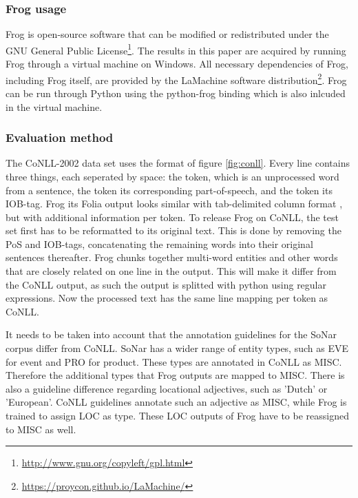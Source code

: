 \subsubsection{Frog usage}
Frog is open-source software that can be modified or redistributed under the GNU General Public License\footnote{\url{http://www.gnu.org/copyleft/gpl.html}}. The results in this paper are acquired by running Frog through a virtual machine on Windows. All necessary dependencies of Frog, including Frog itself, are provided by the LaMachine software distribution\footnote{\url{https://proycon.github.io/LaMachine/}}. Frog can be run through Python using the python-frog binding which is also inlcuded in the virtual machine.

\subsubsection{Evaluation method}
The CoNLL-2002 data set uses the format of figure \ref{fig:conll}. Every line contains three things, each seperated by space: the token, which is an unprocessed word from a sentence, the token its corresponding part-of-speech, and the token its IOB-tag. Frog its Folia output looks similar with tab-delimited column format , but with additional information per token. To release Frog on CoNLL, the test set first has to be reformatted to its original text. This is done by removing the PoS and IOB-tags, concatenating the remaining words into their original sentences thereafter.  Frog chunks together multi-word entities and other words that are closely related on one line in the output. This will make it differ from the CoNLL output, as such the output is splitted with python using regular expressions. Now the processed text has the same line mapping per token as CoNLL.

It needs to be taken into account that the annotation guidelines for the SoNar corpus differ from CoNLL. SoNar has a wider range of entity types, such as EVE for event and PRO for product. These types are annotated in CoNLL as MISC. Therefore the additional types that Frog outputs are mapped to MISC. There is also a guideline difference regarding locational adjectives, such as 'Dutch' or 'European'. CoNLL guidelines annotate such an adjective as MISC, while Frog is trained to assign LOC as type. These LOC outputs of Frog have to be reassigned to MISC as well.

